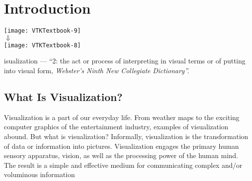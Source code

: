\chapter[Introduction]{Introduction}
\label{chap:introduction}

\vspace{-5\baselineskip} %
\hfill
 \begin{minipage}{0.5\textwidth}
 \centering
 \texttt{[image: VTKTextbook-9]}\\
 $\mathbf{\Downarrow}$\\
 \texttt{[image: VTKTextbook-8]}\\
 \end{minipage}
\vspace{2\baselineskip}

isualization --- ``2: the act or process of interpreting in
visual terms or of putting into visual form, \emph{Webster's Ninth New Collegiate Dictionary''.}

\section{What Is Visualization?}
Visualization is a part of our everyday life. From weather maps to the exciting computer graphics of the entertainment industry, examples of visualization abound.
But what is visualization? Informally, visualization is the transformation of data or information into pictures.
Visualization engages the primary human sensory apparatus, vision, as well as the processing power of the human mind.
The result is a simple and effective medium for communicating complex and/or voluminous information

